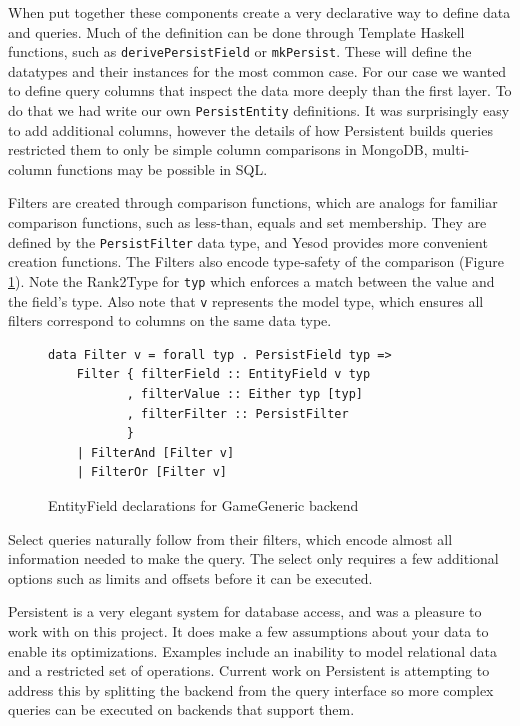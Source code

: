 \documentclass[letterpaper,twocolumn,9pt]{article}
\newcommand{\code}[1]{\texttt{#1}}
\begin{document}
When put together these components create a very declarative way to define data and queries.  Much of the definition can be done through Template Haskell functions, such as \code{derivePersistField} or \code{mkPersist}.  These will define the datatypes and their instances for the most common case.  For our case we wanted to define query columns that inspect the data more deeply than the first layer.  To do that we had write our own \code{PersistEntity} definitions.  It was surprisingly easy to add additional columns, however the details of how Persistent builds queries restricted them to only be simple column comparisons in MongoDB, multi-column functions may be possible in SQL.

Filters are created through comparison functions, which are analogs for familiar comparison functions, such as less-than, equals and set membership.  They are defined by the \code{PersistFilter} data type, and Yesod provides more convenient creation functions.  The Filters also encode type-safety of the comparison (Figure \ref{Filter}).  Note the Rank2Type for \code{typ} which enforces a match between the value and the field's type.  Also note that \code{v} represents the model type, which ensures all filters correspond to columns on the same data type.
\begin{figure}[]
\footnotesize{
\begin{verbatim}
data Filter v = forall typ . PersistField typ =>
    Filter { filterField :: EntityField v typ
           , filterValue :: Either typ [typ]
           , filterFilter :: PersistFilter
           }
    | FilterAnd [Filter v]
    | FilterOr [Filter v]
\end{verbatim}
}
    \caption{EntityField declarations for GameGeneric backend}
    \label{Filter}
\end{figure}
Select queries naturally follow from their filters, which encode almost all information needed to make the query.  The select only requires a few additional options such as limits and offsets before it can be executed.

Persistent is a very elegant system for database access, and was a pleasure to work with on this project.  It does make a few assumptions about your data to enable its optimizations.  Examples include an inability to model relational data and a restricted set of operations.  Current work on Persistent is attempting to address this by splitting the backend from the query interface so more complex queries can be executed on backends that support them.
\end{document}
